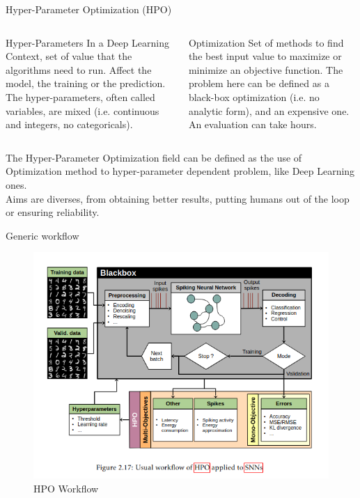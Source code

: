 \begin{frame}[allowframebreaks]{Hyper-Parameter Optimization (HPO)}
    
    \begin{columns}
    
        \begin{column}[t]{0.45\textwidth}
        \begin{block}{Hyper-Parameters}
            In a Deep Learning Context, set of value that the algorithms need to run. Affect the model, the training or the prediction. The hyper-parameters, often called variables, are mixed (i.e. continuous and integers, no categoricals).
        \end{block}
        \end{column}
        
        \begin{column}[t]{0.45\textwidth}
        \begin{block}{Optimization}
            Set of methods to find the best input value to maximize or minimize an objective function. The problem here can be defined as a black-box optimization (i.e. no analytic form), and an expensive one. An evaluation can take hours.
        \end{block}
        \end{column}
         
  \end{columns}

    \vspace{1cm}
  
      \noindent The Hyper-Parameter Optimization field can be defined as the use of Optimization method to hyper-parameter dependent problem, like Deep Learning ones.\\
      Aims are diverses, from obtaining better results, putting humans out of the loop or ensuring reliability.

\framebreak

\begin{block}{Generic workflow}
    \begin{figure}
        \centering
        \includegraphics[width=0.4\linewidth]{imgs/hpo_workflow.png}
        \caption{HPO Workflow}
    \end{figure}

    
\end{block}
\end{frame}